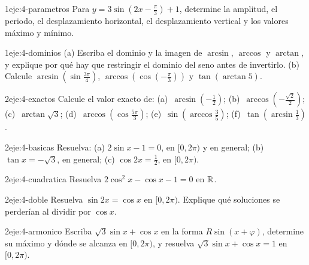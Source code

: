 \begin{ejercicio}{1}{eje:4-parametros}
Para $y=3\sin(2x-\frac{\pi}{3})+1$, determine la amplitud, el periodo, el desplazamiento horizontal, el desplazamiento vertical y los valores máximo y mínimo.
\end{ejercicio}

\begin{ejercicio}{1}{eje:4-dominios}
(a) Escriba el dominio y la imagen de $\arcsin$, $\arccos$ y $\arctan$, y explique por qué hay que restringir el dominio del seno antes de invertirlo. (b) Calcule $\arcsin(\sin\frac{3\pi}{4})$, $\arccos(\cos(-\frac{\pi}{3}))$ y $\tan(\arctan5)$.
\end{ejercicio}

\begin{ejercicio}{2}{eje:4-exactos}
Calcule el valor exacto de: (a)~$\arcsin(-\frac12)$; (b)~$\arccos(-\frac{\sqrt2}{2})$; (c)~$\arctan\sqrt3$; (d)~$\arccos(\cos\frac{5\pi}{3})$; (e)~$\sin(\arccos\frac35)$; (f)~$\tan(\arcsin\frac13)$.
\end{ejercicio}

\begin{ejercicio}{2}{eje:4-basicas}
Resuelva: (a) $2\sin x-1=0$, en $[0,2\pi)$ y en general; (b) $\tan x=-\sqrt3$, en general; (c) $\cos2x=\frac12$, en $[0,2\pi)$.
\end{ejercicio}

\begin{ejercicio}{2}{eje:4-cuadratica}
Resuelva $2\cos^{2}x-\cos x-1=0$ en $\mathbb{R}$.
\end{ejercicio}

\begin{ejercicio}{2}{eje:4-doble}
Resuelva $\sin2x=\cos x$ en $[0,2\pi)$. Explique qué soluciones se perderían al dividir por $\cos x$.
\end{ejercicio}

\begin{ejercicio}{2}{eje:4-armonico}
Escriba $\sqrt3\sin x+\cos x$ en la forma $R\sin(x+\varphi)$, determine su máximo y dónde se alcanza en $[0,2\pi)$, y resuelva $\sqrt3\sin x+\cos x=1$ en $[0,2\pi)$.
\end{ejercicio}

